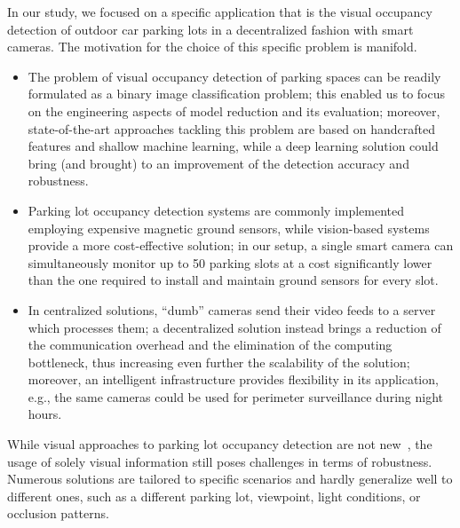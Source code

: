 In our study, we focused on a specific application that is the visual occupancy detection of outdoor car parking lots in a decentralized fashion with smart cameras.
The motivation for the choice of this specific problem is manifold.
\begin{itemize}
    \item The problem of visual occupancy detection of parking spaces can be readily formulated as a binary image classification problem;
    this enabled us to focus on the engineering aspects of model reduction and its evaluation;
    moreover, state-of-the-art approaches tackling this problem are based on handcrafted features and shallow machine learning, while a deep learning solution could bring (and brought) to an improvement of the detection accuracy and robustness.

    \item Parking lot occupancy detection systems are commonly implemented employing expensive magnetic ground sensors, while vision-based systems provide a more cost-effective solution;
    in our setup, a single smart camera can simultaneously monitor up to 50 parking slots at a cost significantly lower than the one required to install and maintain ground sensors for every slot.

    \item In centralized solutions, ``dumb'' cameras send their video feeds to a server which processes them;
    a decentralized solution instead brings a reduction of the communication overhead and the elimination of the computing bottleneck, thus increasing even further the scalability of the solution;
    moreover, an intelligent infrastructure provides flexibility in its application, e.g., the same cameras could be used for perimeter surveillance during night hours.

\end{itemize}
%
While visual approaches to parking lot occupancy detection are not new~\cite{dan2002parking,wu2007robust,del2015vacant,de2015pklot}, the usage of solely visual information still poses challenges in terms of robustness.
Numerous solutions are tailored to specific scenarios and hardly generalize well to different ones, such as a different parking lot, viewpoint, light conditions, or occlusion patterns.

